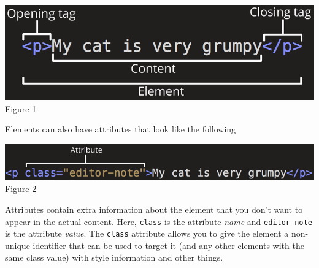 \documentclass{article}
\begin{document}
    \begin{center}
    	\includegraphics[scale=0.4]{HTML_el.png}\\
    	\footnotesize Figure 1
    \end{center}
    
    \noindent Elements can also have attributes that look like the following
    
    \begin{center}
    	\includegraphics[scale=0.4]{HTML_el_att.png}\\
    	\footnotesize Figure 2
    \end{center}

    Attributes contain extra information about the element that you don't want to appear in the actual content. Here, {\tt class} is the attribute \textit{name} and {\tt editor-note} is the attribute \textit{value}. The {\tt class} attribute allows you to give the element a non-unique identifier that can be used to target it (and any other elements with the same class value) with style information and other things.
    
	\pagebreak
	
\end{document}
